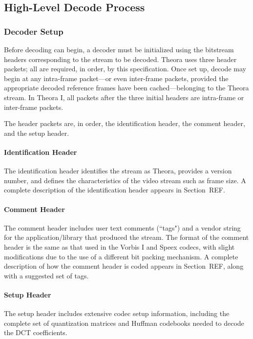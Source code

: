 \documentclass[11pt,letterpaper]{article}
\begin{document}
\subsection{High-Level Decode Process}

\subsubsection{Decoder Setup}

Before decoding can begin, a decoder must be initialized using the bitstream
 headers corresponding to the stream to be decoded.
Theora uses three header packets; all are required, in order, by this
 specification.
Once set up, decode may begin at any intra-frame packet---or even inter-frame
 packets, provided the appropriate decoded reference frames have been
 cached---belonging to the Theora stream.
In Theora I, all packets after the three initial headers are intra-frame or
 inter-frame packets.

The header packets are, in order, the identification header, the comment
 header, and the setup header.

\paragraph{Identification Header}

The identification header identifies the stream as Theora, provides a version
 number, and defines the characteristics of the video stream such as frame
 size.
A complete description of the identification header appears in Section~REF.

\paragraph{Comment Header}

The comment header includes user text comments (``tags") and a vendor string
 for the application/library that produced the stream.
The format of the comment header is the same as that used in the Vorbis I and
 Speex codecs, with slight modifications due to the use of a different bit
 packing mechanism.
A complete description of how the comment header is coded appears in
 Section~REF, along with a suggested set of tags.

\paragraph{Setup Header}

The setup header includes extensive codec setup information, including the
 complete set of quantization matrices and Huffman codebooks needed to decode
 the DCT coefficients.
\end{document}
